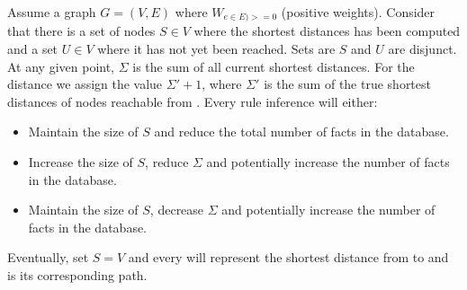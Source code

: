 \begin{theorem}[Correctness]

   Assume a graph $G = (V, E)$ where $W_{e \in E) >= 0}$ (positive weights).
   Consider that there is a set of nodes $S \in V$ where the shortest distances
   has been computed and a set $U \in V$ where it has not yet been reached.
   Sets are $S$ and $U$ are disjunct. At any given point, $\Sigma$ is the sum of
   all current shortest distances. For the distance  we assign the
   value $\Sigma' + 1$, where $\Sigma'$ is the sum of the true shortest
   distances of nodes reachable from .  Every rule inference will
   either:

   \begin{itemize}
      \item Maintain the size of $S$ and reduce the total number of facts in
         the database.
      \item Increase the size of $S$, reduce $\Sigma$ and potentially increase the number of
         facts in the database.
      \item Maintain the size of $S$, decrease $\Sigma$
         and potentially increase the number of facts in the database.
   \end{itemize}

   Eventually, set $S = V$ and every  will represent
   the shortest distance from  to  and  is its
   corresponding path.
\end{theorem}

